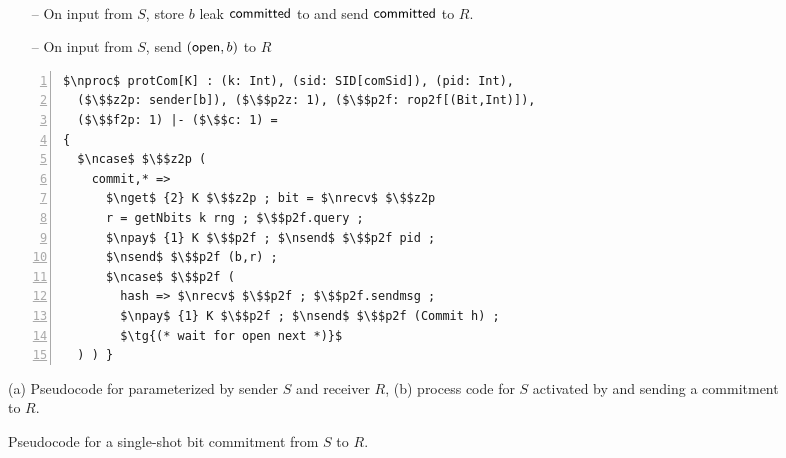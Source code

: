 \begin{figure}
\centering
\begin{minipage}{0.5\textwidth}
\begin{bbox}[title={Functionality $\F_{\m{com}}(S, R)$}]
~
\begin{itemize}
\item[--] On input  from $S$, store $b$ leak $\mathsf{committed}$ to \A and send $\mathsf{committed}$ to $R$.
\item[--] On input  from $S$, send $(\mathsf{open}, b)$ to $R$
\end{itemize}
%
%
%
%
\end{bbox}
\end{minipage}
\hspace{3em}
\begin{minipage}{0.5\textwidth}
\begin{lstlisting}[basicstyle=\scriptsize\BeraMonottFamily, frame=single, mathescape, numbers=left, xleftmargin=2em, xrightmargin=2em]
$\nproc$ protCom[K] : (k: Int), (sid: SID[comSid]), (pid: Int),
  ($\$$z2p: sender[b]), ($\$$p2z: 1), ($\$$p2f: rop2f[(Bit,Int)]), 
  ($\$$f2p: 1) |- ($\$$c: 1) =
{
  $\ncase$ $\$$z2p (
    commit,* =>
      $\nget$ {2} K $\$$z2p ; bit = $\nrecv$ $\$$z2p 
      r = getNbits k rng ; $\$$p2f.query ;
      $\npay$ {1} K $\$$p2f ; $\nsend$ $\$$p2f pid ;
      $\nsend$ $\$$p2f (b,r) ;
      $\ncase$ $\$$p2f (
        hash => $\nrecv$ $\$$p2f ; $\$$p2f.sendmsg ;
        $\npay$ {1} K $\$$p2f ; $\nsend$ $\$$p2f (Commit h) ;
        $\tg{(* wait for open next *)}$
  ) ) }
\end{lstlisting}
\end{minipage}
\caption{(a) Pseudocode for \Fcom parameterized by sender $S$ and receiver $R$, (b) \protcom process code for $S$ activated by \Z and sending a commitment to $R$.}
\caption{Pseudocode for a single-shot bit commitment from $S$ to $R$.}
\label{fig:fcomideal}
\end{figure}
